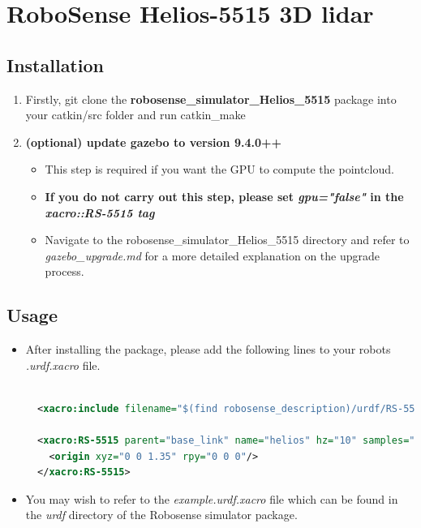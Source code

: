 \documentclass[11pt]{article}
\begin{document}
\section{RoboSense Helios-5515 3D lidar}

\subsection{Installation}
\begin{enumerate}
 \item {Firstly, git clone the \textbf{robosense\_simulator\_Helios\_5515} package into your catkin/src folder and run catkin\_make}
 \item{
       \textbf{(optional) update gazebo to version 9.4.0++}
       
       \begin{itemize}
        \item { This step is required if you want the GPU to compute the pointcloud.}
        \item {
              \textbf{If you do not carry out this step, please set \emph{gpu="false"} in the \emph{xacro::RS-5515 tag}
              }
              
              }
        \item{
              Navigate to the robosense\_simulator\_Helios\_5515 directory and refer to \emph{gazebo\_upgrade.md} for a more detailed explanation on the upgrade process.
              }
       \end{itemize}
       }
\end{enumerate}
\subsection{Usage}
\begin{itemize}
 \item {
       After installing the package, please add the following lines to your robots \emph{.urdf.xacro} file.
       \begin{lstlisting}[language=xml]

  <xacro:include filename="$(find robosense_description)/urdf/RS-5515.urdf.xacro"/>

  <xacro:RS-5515 parent="base_link" name="helios" hz="10" samples="1800" gpu="true" noise="0.002">
    <origin xyz="0 0 1.35" rpy="0 0 0"/>
  </xacro:RS-5515>
\end{lstlisting}
       }
 \item{
       You may wish to refer to the \emph{example.urdf.xacro} file which can be found in the \emph{urdf} directory of the Robosense simulator package.
       
       }
\end{itemize}
\end{document}

